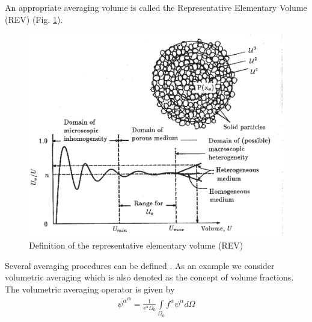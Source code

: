 
An appropriate averaging volume is called
the Representative Elementary Volume (REV) (Fig. \ref{rev}).

\begin{figure}[htb!]
\begin{center}
\footnotesize
\includegraphics[width=0.95\columnwidth]{figures/por2.eps}  %
\caption{Definition of the representative elementary volume (REV) \cite{BeaBac:90}} 
\label{rev}
\end{center}
\end{figure}
%


Several averaging procedures can be defined \cite{BeaBac:90}. As
an example we consider volumetric averaging which is also denoted as the
concept of volume fractions. The volumetric averaging operator is given by
%
\begin{eqnarray}
\overline{\psi^\alpha}^\alpha
=
\frac{1}{\epsilon^\alpha \Omega_0}
\int\limits_{\Omega_0} f^\alpha \psi^\alpha d\Omega
\label{eqn:mean}
\end{eqnarray}

